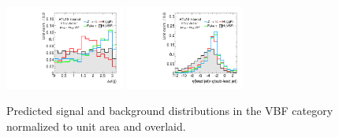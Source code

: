 \begin{figure}[tp]
  \includegraphics[width=0.35\textwidth]{figures/overlaid/vbf/jets-dphi}
  \includegraphics[width=0.35\textwidth]{figures/overlaid/vbf/jets-etaprod}
  \caption{Predicted signal and background distributions in the VBF category normalized to unit area and overlaid.}
  \label{fig:strategy-overlaid-vbf-jets}
\end{figure}

